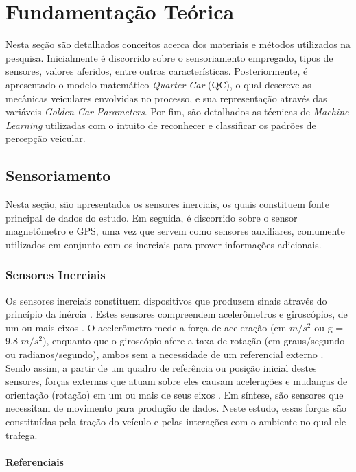 \chapter{Fundamentação Teórica}
\label{cap:fundamentacao}

Nesta seção são detalhados conceitos acerca dos materiais e métodos utilizados na pesquisa. Inicialmente é discorrido sobre o sensoriamento empregado, tipos de sensores, valores aferidos, entre outras características. Posteriormente, é apresentado o modelo matemático \textit{Quarter-Car} (QC), o qual descreve as mecânicas veiculares envolvidas no processo, e sua representação através das variáveis \textit{Golden Car Parameters}. Por fim, são detalhados as técnicas de \textit{Machine Learning} utilizadas com o intuito de reconhecer e classificar os padrões de percepção veicular.

\section{Sensoriamento}

Nesta seção, são apresentados os sensores inerciais, os quais constituem fonte principal de dados do estudo. Em seguida, é discorrido sobre o sensor magnetômetro e GPS, uma vez que servem como sensores auxiliares, comumente utilizados em conjunto com os inerciais para prover informações adicionais. 

\subsection{Sensores Inerciais}

Os sensores inerciais constituem dispositivos que produzem sinais através do princípio da inércia \cite{Braga2017}. Estes sensores compreendem acelerômetros e giroscópios, de um ou mais eixos \cite{Beeby2004}. O acelerômetro mede a força de aceleração (em $m/s^2$ ou g = 9.8 $m/s^2$), enquanto que o giroscópio afere a taxa de rotação (em graus/segundo ou radianos/segundo), ambos sem a necessidade de um referencial externo \cite{Groves2013}. Sendo assim, a partir de um quadro de referência ou posição inicial destes sensores, forças externas que atuam sobre eles causam acelerações e mudanças de orientação (rotação) em um ou mais de seus eixos \cite{Kempe2011}. Em síntese, são sensores que necessitam de movimento para produção de dados. Neste estudo, essas forças são constituídas pela tração do veículo e pelas interações com o ambiente no qual ele trafega.

\subsubsection{Referenciais}

